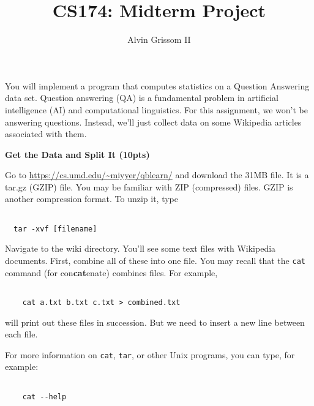 \documentclass[10pt]{article}
\newenvironment{problem}[2][Problem]{\begin{trivlist}

\item[\hskip \labelsep {\bfseries #1}\hskip \labelsep {\bfseries #2.}]}{\end{trivlist}}
\begin{document}
 



\title{CS174: Midterm Project}

\author{Alvin Grissom II}

\maketitle

You will implement a program that computes statistics on a Question Answering data set.  Question answering (QA) is a fundamental problem in artificial intelligence (AI) and computational linguistics.  For this assignment, we won't be answering questions.  Instead, we'll just collect data on some Wikipedia articles associated with them.

 \begin{problem}{1}

 \textbf{Get the Data and Split It (10pts)}

 Go to \url{https://cs.umd.edu/~miyyer/qblearn/} and download the 31MB file.  It is a tar.gz (GZIP) file.  You may be familiar with ZIP (compressed) files.  GZIP is another compression format. To unzip it, type

 \begin{verbatim}

  tar -xvf [filename]

\end{verbatim}



Navigate to the wiki directory.  You'll see some text files with Wikipedia documents.  First, combine all of these into one file.  You may recall that the \texttt{cat} command (for con\textbf{cat}enate) combines files.  For example, 

 \begin{verbatim}

    cat a.txt b.txt c.txt > combined.txt

\end{verbatim}

will print out these files in succession.  But we need to insert a new line between each file.  

For more information on \texttt{cat}, \texttt{tar}, or other Unix programs, you can type, for example:

 \begin{verbatim}

    cat --help


\end{verbatim}
\end{problem}
\end{document}
